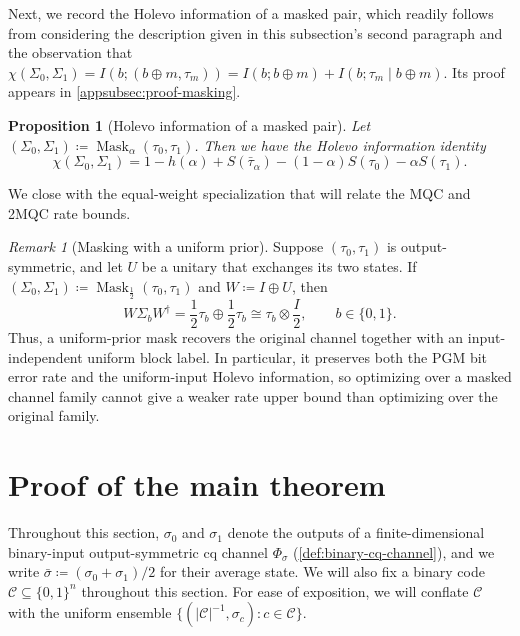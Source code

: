 \documentclass[11pt]{article}
\newtheorem{prop}[prop]{Proposition}
\theoremstyle{remark}
\newtheorem{remark}{Remark}[section]
\newcommand{\cC}{\mathcal{C}}
\newcommand{\bits}{\{0,1\}}
\newcommand{\abs}[1]{\left|#1\right|}
\begin{document}
Next, we record the Holevo information of a masked pair, which readily follows from considering the description given in this subsection's second paragraph and the observation that $\chi(\Sigma_0,\Sigma_1) = I(b;(b \oplus m,\tau_m)) = I(b;b \oplus m) + I(b;\tau_m \mid b \oplus m)$. Its proof appears in \cref{appsubsec:proof-masking}.

\begin{prop}[Holevo information of a masked pair]
\label{prop:masking-holevo}
Let $(\Sigma_0, \Sigma_1) \coloneqq \operatorname{Mask}_\alpha(\tau_0,\tau_1)$. Then we have the Holevo information identity
\begin{equation}
\label{eq:masking-holevo}
\chi(\Sigma_0,\Sigma_1) = 1 - h(\alpha) + S(\bar{\tau}_\alpha) - (1-\alpha)S(\tau_0)-\alpha S(\tau_1).
\end{equation}
\end{prop}

We close with the equal-weight specialization that will relate the MQC and 2MQC rate bounds.

\begin{remark}[Masking with a uniform prior]
\label{rem:masking-uniform-prior}
Suppose $(\tau_0,\tau_1)$ is output-symmetric, and let $U$ be a unitary that exchanges its two states. If $(\Sigma_0,\Sigma_1) \coloneqq \operatorname{Mask}_{\frac{1}{2}}(\tau_0,\tau_1)$ and $W \coloneqq I \oplus U$, then
\begin{equation*}
W\Sigma_bW^\dagger = \frac{1}{2}\tau_b \oplus \frac{1}{2}\tau_b \cong \tau_b \otimes \frac{I}{2},
\qquad b \in \bits.
\end{equation*}
Thus, a uniform-prior mask recovers the original channel together with an input-independent uniform block label. In particular, it preserves both the PGM bit error rate and the uniform-input Holevo information, so optimizing over a masked channel family cannot give a weaker rate upper bound than optimizing over the original family.
\end{remark}

\section{Proof of the main theorem}
\label{sec:main-theorem-proof}

Throughout this section, $\sigma_0$ and $\sigma_1$ denote the outputs of a finite-dimensional binary-input output-symmetric cq channel $\Phi_\sigma$ (\cref{def:binary-cq-channel}), and we write $\bar{\sigma} \coloneqq (\sigma_0+\sigma_1)/2$ for their average state. We will also fix a binary code $\cC \subseteq \bits^n$ throughout this section. For ease of exposition, we will conflate $\cC$ with the uniform ensemble $\{(\abs{\cC}^{-1},\sigma_c) : c \in \cC\}$.
\end{document}
